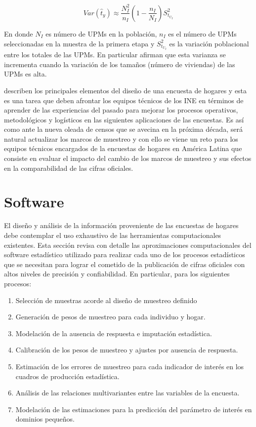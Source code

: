 \documentclass[
  10pt,
  spanish,
]{book}
\providecommand{\tightlist}{%
  \setlength{\itemsep}{0pt}\setlength{\parskip}{0pt}}
\begin{document}
\[Var(\hat{t}_y) \approx \frac{N_I^2}{n_I}\left(1-\frac{n_I}{N_I}\right)S^2_{t_{U_I}} \]

En donde \(N_I\) es número de UPMs en la población, \(n_I\) es el número de UPMs seleccionadas en la muestra de la primera etapa y \(S^2_{t_{U_I}}\) es la variación poblacional entre los totales de las UPMs. En particular \citet[pág. 144]{Sarndal_Swensson_Wretman_2003} afirman que esta varianza se incrementa cuando la variación de los tamaños (número de viviendas) de las UPMs es alta.

\citet{Beland_Dale_Dufour_Hamel_2005} describen los principales elementos del diseño de una encuesta de hogares y esta es una tarea que deben afrontar los equipos técnicos de los INE en términos de aprender de las experiencias del pasado para mejorar los procesos operativos, metodológicos y logísticos en las siguientes aplicaciones de las encuestas. Es así como ante la nueva oleada de censos que se avecina en la próxima década, será natural actualizar los marcos de muestreo y con ello se viene un reto para los equipos técnicos encargados de la encuestas de hogares en América Latina que consiste en evaluar el impacto del cambio de los marcos de muestreo y sus efectos en la comparabilidad de las cifras oficiales.

\hypertarget{software}{%
\chapter{Software}\label{software}}

El diseño y análisis de la información proveniente de las encuestas de hogares debe contemplar el uso exhaustivo de las herramientas computacionales existentes. Esta sección revisa con detalle las aproximaciones computacionales del software estadístico utilizado para realizar cada uno de los procesos estadísticos que se necesitan para lograr el cometido de la publicación de cifras oficiales con altos niveles de precisión y confiabilidad. En particular, para los siguientes procesos:

\begin{enumerate}
\def\labelenumi{\arabic{enumi}.}
\tightlist
\item
  Selección de muestras acorde al diseño de muestreo definido
\item
  Generación de pesos de muestreo para cada individuo y hogar.
\item
  Modelación de la ausencia de respuesta e imputación estadística.
\item
  Calibración de los pesos de muestreo y ajustes por ausencia de respuesta.
\item
  Estimación de los errores de muestreo para cada indicador de interés en los cuadros de producción estadística.
\item
  Análisis de las relaciones multivariantes entre las variables de la encuesta.
\item
  Modelación de las estimaciones para la predicción del parámetro de interés en dominios pequeños.
\end{enumerate}
\end{document}
